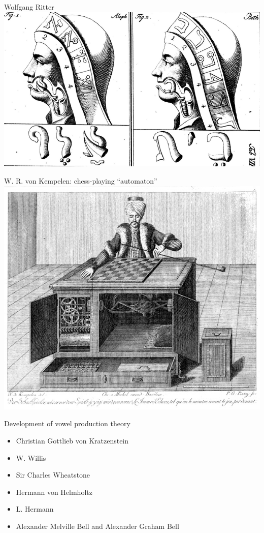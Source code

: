 \begin{frame}{Wolfgang Ritter \href{https://books.google.ru/books?hl=pl&lr=&id=3MRJAAAAcAAJ&oi=fnd&pg=PA1&dq=Mechanismus+der+menschlichen+Sprache+nebst+Beschreibung+einer+sprechenden+Maschine&ots=MW2q1Xb0dG&sig=qwlXuPxE6P_Ruryv-FXckqV10Pk&redir_esc=y\#v=onepage&q=Mechanismus\%20der\%20menschlichen\%20Sprache\%20nebst\%20Beschreibung\%20einer\%20sprechenden\%20Maschine&f=false}{\cite[144]{kempelen91}}}
\centering
\includegraphics[width=\linewidth]{04-kempelen}
\end{frame}

\begin{frame}{W. R. von Kempelen: chess-playing ``automaton''}
\centering
\includegraphics[width=0.85\linewidth]{05-kempelen}
\end{frame}

\begin{frame}{Development of vowel production theory}
\begin{itemize}
\item Christian Gottlieb von Kratzenstein
\item W. Willis
\item Sir Charles Wheatstone
\item Hermann von Helmholtz
\item L. Hermann
\item Alexander Melville Bell and Alexander Graham Bell
\end{itemize}
\end{frame}

